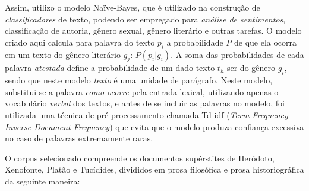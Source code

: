 \documentclass[a4paper,article,12pt,oneside]{memoir}
\begin{document}
Assim, utilizo o modelo Naïve-Bayes, que é utilizado na construção de \emph{classificadores} de texto, podendo ser empregado para \emph{análise de sentimentos}, classificação de autoria, gênero sexual, gênero literário e outras tarefas.
O modelo criado aqui calcula para palavra do texto $p_i$ a probabilidade $P$ de que ela ocorra em um texto do gênero literário $g_j$: $P(p_i|g_i)$.
A soma das probabilidades de cada palavra \emph{atestada} define a probabilidade de um dado texto $t_h$ ser do gênero $g_i$, sendo que neste modelo \emph{texto} é uma unidade de parágrafo.
Neste modelo, substitui-se a palavra \emph{como ocorre} pela entrada lexical, utilizando apenas o vocabulário \emph{verbal} dos textos, e antes de se incluir as palavras no modelo, foi utilizada uma técnica de pré-processamento chamada Td-idf (\emph{Term Frequency -- Inverse Document Frequency}) que evita que o modelo produza confiança excessiva no caso de palavras extremamente raras.

O corpus selecionado compreende os documentos supérstites de Heródoto, Xenofonte, Platão e Tucídides, divididos em prosa filosófica e prosa historiográfica da seguinte maneira:
\end{document}
